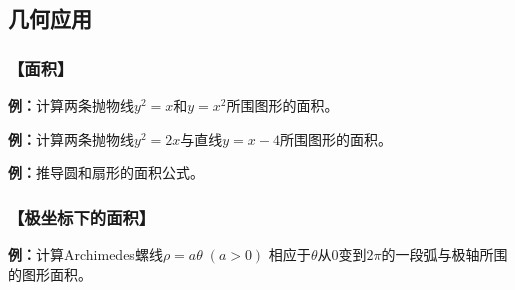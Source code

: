 \begin{center}
\end{center}

\subsection{几何应用}

\subsubsection{【面积】}

{\bf 例：}计算两条抛物线$y^2=x$和$y=x^2$所围图形的面积。

{\bf 例：}计算两条抛物线$y^2=2x$与直线$y=x-4$所围图形的面积。

{\bf 例：}推导圆和扇形的面积公式。

\subsubsection{【极坐标下的面积】}

{\bf 例：}计算Archimedes螺线$\rho=a\theta\;(a>0)$
相应于$\theta$从$0$变到$2\pi$的一段弧与极轴所围的图形面积。

